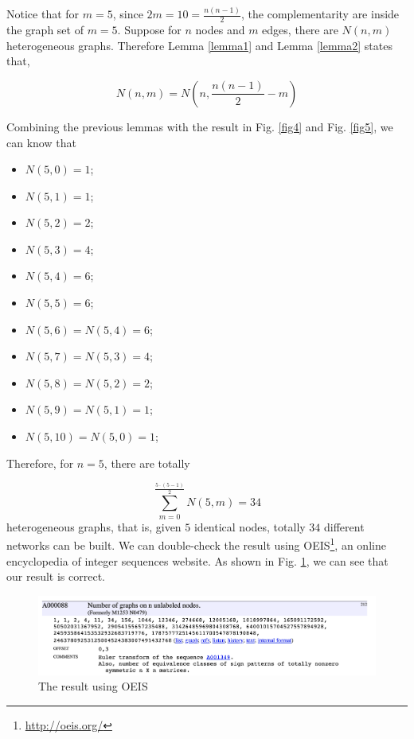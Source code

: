 \documentclass{oxmathproblems}
\makeatletter
\theoremstyle{definition}
\renewenvironment{solution}[1][Solution] {\par\pushQED{\qed}\normalfont\topsep6\p@\@plus6\p@\relax\trivlist\item[\hskip\labelsep\bfseries#1\@addpunct{.}]\ignorespaces}{\popQED\endtrivlist\@endpefalse} \makeatother
\makeatother
\begin{document}
\begin{solution}
	Notice that for $m = 5$, since $2m = 10 = \frac{n(n-1)}{2}$, the complementarity are inside the graph set of $m = 5$. Suppose for $n$ nodes and $m$ edges, there are $N(n,m)$ heterogeneous graphs. Therefore Lemma \ref{lemma1} and Lemma \ref{lemma2} states that,

	$$
	N(n,m) = N\left(n,\frac{n(n-1)}{2} - m\right)
	$$

	Combining the previous lemmas with the result in Fig. \ref{fig4} and Fig. \ref{fig5}, we can know that 

	\begin{itemize}
		\item $N(5, 0) = 1$;
		\item $N(5, 1) = 1$;
		\item $N(5, 2) = 2$;
		\item $N(5, 3) = 4$;
		\item $N(5, 4) = 6$;
		\item $N(5, 5) = 6$;
		\item $N(5, 6) = N(5, 4) = 6$;
		\item $N(5, 7) = N(5, 3) = 4$;
		\item $N(5, 8) = N(5, 2) = 2$;
		\item $N(5, 9) = N(5, 1) = 1$;
		\item $N(5, 10) = N(5, 0) = 1$;
	\end{itemize}

	Therefore, for $n = 5$, there are totally

	$$
	\sum_{m=0}^{\frac{5\cdot(5-1)}{2}} N(5, m) = 34
	$$
heterogeneous graphs, that is, given $5$ identical nodes, totally $34$ different networks can be built. We can double-check the result using OEIS\footnote{\url{http://oeis.org/}}, an online encyclopedia of integer sequences website. As shown in Fig. \ref{fig6}, we can see that our result is correct.

\begin{figure}[htbp]
	\centering
	\includegraphics[width=\linewidth]{6.png}
	\caption{The result using OEIS}
	\label{fig6}
\end{figure}


\end{solution}
\end{document}
